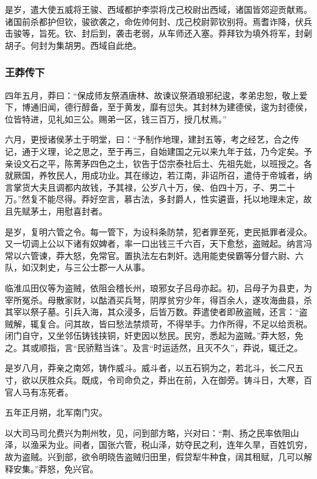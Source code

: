 \documentclass[]{article}
\begin{document}
是岁，遣大使五威将王骏、西域都护李崇将戊己校尉出西域，诸国皆郊迎贡献焉。诸国前杀都护但钦，骏欲袭之，命佐帅何封、戊己校尉郭钦别将。焉耆诈降，伏兵击骏等，旨死。钦、封后到，袭击老弱，从车师还入塞。莽拜钦为填外将军，封劋胡子。何封为集胡男。西域自此绝。

\hypertarget{header-n6911}{%
\subsubsection{王莽传下}\label{header-n6911}}

四年五月，莽曰：``保成师友祭酒唐林、故谏议祭酒琅邪纪逡，孝弟忠恕，敬上爱下，博通旧闻，德行醇备，至于黄发，靡有愆失。其封林为建德侯，逡为封德侯，位皆特进，见礼如三公。赐弟一区，钱三百万，授几杖焉。''

六月，更授诸侯茅土于明堂，曰：``予制作地理，建封五等，考之经艺，合之传记，通于义理，论之思之，至于再三，自始建国之元以来九年于兹，乃今定矣。予亲设文石之平，陈菁茅四色之土，钦告于岱宗泰社后土、先祖先妣，以班授之。各就厥国，养牧民人，用成功业。其在缘边，若江南，非诏所召，遣侍于帝城者，纳言掌货大夫且调都内故钱，予其禄，公岁八十万，侯、伯四十万，子、男二十万。''然复不能尽得。莽好空言，慕古法，多封爵人，性实遴啬，托以地理未定，故且先赋茅土，用慰喜封者。

是岁，复明六管之令。每一管下，为设科条防禁，犯者罪至死，吏民抵罪者浸众。又一切调上公以下诸有奴婢者，率一口出钱三千六百，天下愈愁，盗贼起。纳言冯常以六管谏，莽大怒，免常官。置执法左右刺奸。选用能吏侯霸等分督六尉、六队，如汉刺史，与三公士郡一人从事。

临淮瓜田仪等为盗贼，依阻会稽长州，琅邪女子吕母亦起。初，吕母子为县吏，为宰所冤杀。母散家财，以酤酒买兵弩，阴厚贫穷少年，得百余人，遂攻海曲县，杀其宰以祭子墓。引兵入海，其众浸多，后皆万数。莽遣使者即赦盗贼，还言：``盗贼解，辄复合。问其故，皆曰愁法禁烦苛，不得举手。力作所得，不足以给贡税。闭门自守，又坐邻伍铸钱挟铜，奸吏因以愁民。民穷，悉起为盗贼。''莽大怒，免之。其或顺指，言``民骄黠当诛''。及言``时运适然，且灭不久''，莽说，辄迁之。

是岁八月，莽亲之南郊，铸作威斗。威斗者，以五石铜为之，若北斗，长二尺五寸，欲以厌胜众兵。既成，令司命负之，莽出在前，入在御旁。铸斗日，大寒，百官人马有冻死者。

五年正月朔，北军南门灾。

以大司马司允费兴为荆州牧，见，问到部方略，兴对曰：``荆、扬之民率依阻山泽，以渔采为业。间者，国张六管，税山泽，妨夺民之利，连年久旱，百姓饥穷，故为盗贼。兴到部，欲令明晓告盗贼归田里，假贷犁牛种食，阔其租赋，几可以解释安集。''莽怒，免兴官。
\end{document}
